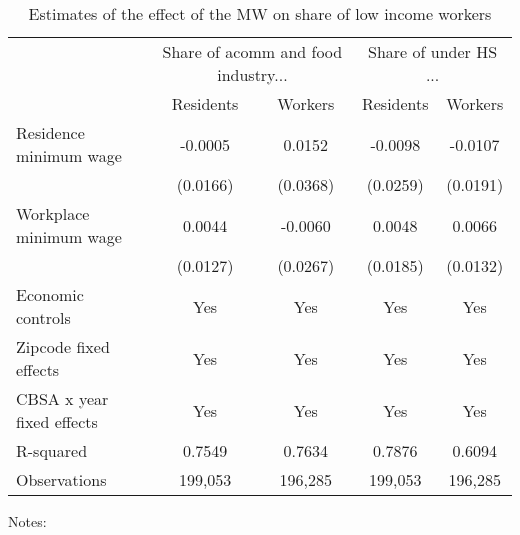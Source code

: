 \begin{table}[hbt!] \centering
    \caption{Estimates of the effect of the MW on share of low income workers}
    \label{tab:share_migration}
    \begin{tabular}{lcccc}
        \toprule 
         & \multicolumn{2}{c}{Share of acomm and food industry...} & \multicolumn{2}{c}{Share of under HS ...} \\ \cmidrule(lr){2-3} \cmidrule(lr){4-5}
                    & Residents & Workers & Residents & Workers \\  \midrule
        Residence minimum wage &  -0.0005  &  0.0152  &  -0.0098  &  -0.0107  \\
                               & (0.0166) & (0.0368) & (0.0259) & (0.0191) \\
        Workplace minimum wage &  0.0044  &  -0.0060  &  0.0048  &  0.0066  \\
                               & (0.0127) & (0.0267) & (0.0185) & (0.0132) \\  \midrule
        Economic controls           &  Yes   &  Yes   &  Yes  &  Yes  \\
        Zipcode fixed effects       &  Yes   &  Yes   &  Yes  &  Yes  \\
        CBSA x year fixed effects   &  Yes   &  Yes   &  Yes  &  Yes  \\
        R-squared                   &  0.7549   &  0.7634   &  0.7876  &  0.6094  \\
        Observations                &  199,053  &  196,285  &  199,053 &  196,285  
        \\\bottomrule
    \end{tabular}

    
    \begin{minipage}{.95\textwidth} \footnotesize
        \vspace{2mm}
        Notes:
    \end{minipage}
\end{table}
